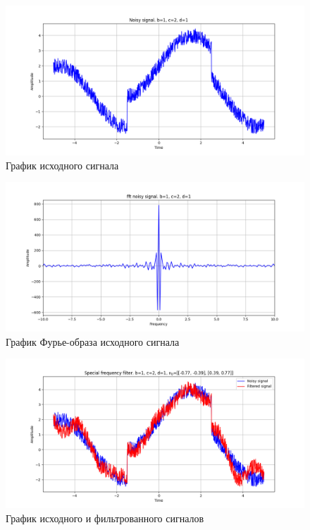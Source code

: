 \documentclass[a4paper, 12pt]{article}
\begin{document}
    
    \begin{figure}[!htb]
        \centering
        \includegraphics[scale=0.485]{1_u_nospec.png}
        \captionsetup{skip=0pt}
        \caption{График исходного сигнала}
        \label{fig:fig69}
    \end{figure}
    \begin{figure}[!htb]
        \centering
        \includegraphics[scale=0.485]{1_fft_u_nospec.png}
        \captionsetup{skip=0pt}
        \caption{График Фурье-образа исходного сигнала}
        \label{fig:fig70}
    \end{figure}
    \begin{figure}[!htb]
        \centering
        \includegraphics[scale=0.485]{1_u_flt_u_nospec.png}
        \captionsetup{skip=0pt}
        \caption{График исходного и фильтрованного сигналов}
        \label{fig:fig71}
    \end{figure}
\end{document}
